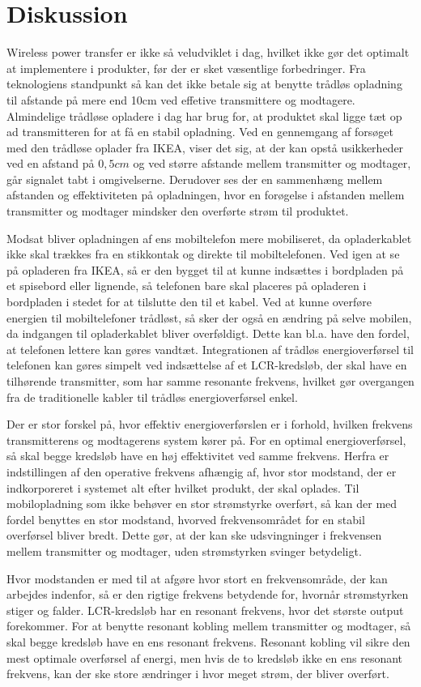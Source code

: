 \chapter{Diskussion}

Wireless power transfer er ikke så veludviklet i dag, hvilket ikke gør det optimalt at implementere i produkter, før der er sket væsentlige forbedringer. Fra teknologiens standpunkt så kan det ikke betale sig at benytte trådløs opladning til afstande på mere end 10cm ved effetive transmittere og modtagere. Almindelige trådløse opladere i dag har brug for, at produktet skal ligge tæt op ad transmitteren for at få en stabil opladning. Ved en gennemgang af forsøget med den trådløse oplader fra IKEA, viser det sig, at der kan opstå usikkerheder ved en afstand på $0,5 cm$ og ved større afstande mellem transmitter og modtager, går signalet tabt i omgivelserne. Derudover ses der en sammenhæng mellem afstanden og effektiviteten på opladningen, hvor en forøgelse i afstanden mellem transmitter og modtager mindsker den overførte strøm til produktet.

Modsat bliver opladningen af ens mobiltelefon mere mobiliseret, da opladerkablet ikke skal trækkes fra en stikkontak og direkte til mobiltelefonen. Ved igen at se på opladeren fra IKEA, så er den bygget til at kunne indsættes i bordpladen på et spisebord eller lignende, så telefonen bare skal placeres på opladeren i bordpladen i stedet for at tilslutte den til et kabel. Ved at kunne overføre energien til mobiltelefoner trådløst, så sker der også en ændring på selve mobilen, da indgangen til opladerkablet bliver overføldigt. Dette kan bl.a. have den fordel, at telefonen lettere kan gøres vandtæt. Integrationen af trådløs energioverførsel til telefonen kan gøres simpelt ved indsættelse af et LCR-kredsløb, der skal have en tilhørende transmitter, som har samme resonante frekvens, hvilket gør overgangen fra de traditionelle kabler til trådløs energioverførsel enkel.

Der er stor forskel på, hvor effektiv energioverførslen er i forhold, hvilken frekvens transmitterens og modtagerens system kører på. For en optimal energioverførsel, så skal begge kredsløb have en høj effektivitet ved samme frekvens. Herfra er indstillingen af den operative frekvens afhængig af, hvor stor modstand, der er indkorporeret i systemet alt efter hvilket produkt, der skal oplades. Til mobilopladning som ikke behøver en stor strømstyrke overført, så kan der med fordel benyttes en stor modstand, hvorved frekvensområdet for en stabil overførsel bliver bredt. Dette gør, at der kan ske udsvingninger i frekvensen mellem transmitter og modtager, uden strømstyrken svinger betydeligt.

Hvor modstanden er med til at afgøre hvor stort en frekvensområde, der kan arbejdes indenfor, så er den rigtige frekvens betydende for, hvornår strømstyrken stiger og falder. LCR-kredsløb har en resonant frekvens, hvor det største output forekommer. For at benytte resonant kobling mellem transmitter og modtager, så skal begge kredsløb have en ens resonant frekvens. Resonant kobling vil sikre den mest optimale overførsel af energi, men hvis de to kredsløb ikke en ens resonant frekvens, kan der ske store ændringer i hvor meget strøm, der bliver overført.